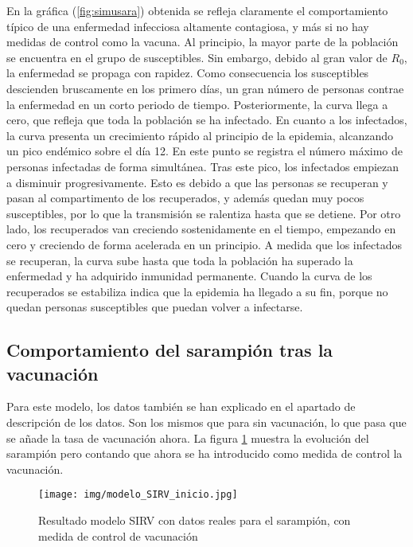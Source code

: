 En la gráfica (\ref{fig:simusara}) obtenida se refleja claramente el comportamiento típico de una enfermedad infecciosa altamente contagiosa, y más si no hay medidas de control como la vacuna.
Al principio, la mayor parte de la población se encuentra en el grupo de susceptibles. Sin embargo, debido al gran valor de $R_0$, la enfermedad se propaga con rapidez. Como consecuencia los susceptibles descienden bruscamente en los primero días, un gran número de personas contrae la enfermedad en un corto periodo de tiempo. Posteriormente, la curva llega a cero, que refleja que toda la población se ha infectado.
En cuanto a los infectados, la curva presenta un crecimiento rápido al principio de la epidemia, alcanzando un pico endémico sobre el día 12. En este punto se registra el número máximo de personas infectadas de forma simultánea. Tras este pico, los infectados empiezan a disminuir progresivamente. Esto es debido a que las personas se recuperan y pasan al compartimento de los recuperados, y además quedan muy pocos susceptibles, por lo que la transmisión se ralentiza hasta que se detiene.
Por otro lado, los recuperados van creciendo sostenidamente en el tiempo, empezando en cero y creciendo de forma acelerada en un principio. A medida que los infectados se recuperan, la curva sube hasta que toda la población ha superado la enfermedad y ha adquirido inmunidad permanente. Cuando la curva de los recuperados se estabiliza indica que la epidemia ha llegado a su fin, porque no quedan personas susceptibles que puedan volver a infectarse.

\subsection{Comportamiento del sarampión tras la vacunación}
Para este modelo, los datos también se han explicado en el apartado de descripción de los datos. Son los mismos que para sin vacunación, lo que pasa que se añade la tasa de vacunación ahora. La figura \ref{fig:simu saramp vacuna} muestra la evolución del sarampión pero contando que ahora se ha introducido como medida de control la vacunación.

\begin{figure}[H]
    \centering
    \texttt{[image: img/modelo\_SIRV\_inicio.jpg]}
    \caption{Resultado modelo SIRV con datos reales para el sarampión, con medida de control de vacunación}
    \label{fig:simu saramp vacuna}
    \vspace{0.5cm} %
\end{figure}

